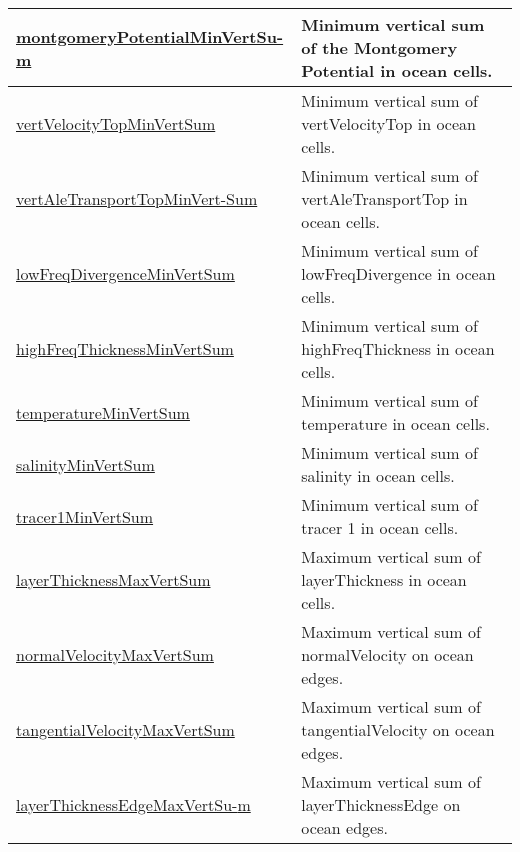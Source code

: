 {\begin{center}
\begin{longtable}{| p{2.0in} | p{4.0in} |}
	\hline
	\hyperref[subsec:var_sec_amGlobalStats_montgomeryPotentialMinVertSum]{montgomeryPotentialMinVertSu-}\hyperref[subsec:var_sec_amGlobalStats_montgomeryPotentialMinVertSum]{m}  & Minimum vertical sum of the Montgomery Potential in ocean cells. \\
	\hline
	\hyperref[subsec:var_sec_amGlobalStats_vertVelocityTopMinVertSum]{vertVelocityTopMinVertSum} & Minimum vertical sum of vertVelocityTop in ocean cells. \\
	\hline
	\hyperref[subsec:var_sec_amGlobalStats_vertAleTransportTopMinVertSum]{vertAleTransportTopMinVert-}\hyperref[subsec:var_sec_amGlobalStats_vertAleTransportTopMinVertSum]{Sum}  & Minimum vertical sum of vertAleTransportTop in ocean cells. \\
	\hline
	\hyperref[subsec:var_sec_amGlobalStats_lowFreqDivergenceMinVertSum]{lowFreqDivergenceMinVertSum} & Minimum vertical sum of lowFreqDivergence in ocean cells. \\
	\hline
	\hyperref[subsec:var_sec_amGlobalStats_highFreqThicknessMinVertSum]{highFreqThicknessMinVertSum} & Minimum vertical sum of highFreqThickness in ocean cells. \\
	\hline
	\hyperref[subsec:var_sec_amGlobalStats_temperatureMinVertSum]{temperatureMinVertSum} & Minimum vertical sum of temperature in ocean cells. \\
	\hline
	\hyperref[subsec:var_sec_amGlobalStats_salinityMinVertSum]{salinityMinVertSum} & Minimum vertical sum of salinity in ocean cells. \\
	\hline
	\hyperref[subsec:var_sec_amGlobalStats_tracer1MinVertSum]{tracer1MinVertSum} & Minimum vertical sum of tracer 1 in ocean cells. \\
	\hline
	\hyperref[subsec:var_sec_amGlobalStats_layerThicknessMaxVertSum]{layerThicknessMaxVertSum} & Maximum vertical sum of layerThickness in ocean cells. \\
	\hline
	\hyperref[subsec:var_sec_amGlobalStats_normalVelocityMaxVertSum]{normalVelocityMaxVertSum} & Maximum vertical sum of normalVelocity on ocean edges. \\
	\hline
	\hyperref[subsec:var_sec_amGlobalStats_tangentialVelocityMaxVertSum]{tangentialVelocityMaxVertSum} & Maximum vertical sum of tangentialVelocity on ocean edges. \\
	\hline
	\hyperref[subsec:var_sec_amGlobalStats_layerThicknessEdgeMaxVertSum]{layerThicknessEdgeMaxVertSu-}\hyperref[subsec:var_sec_amGlobalStats_layerThicknessEdgeMaxVertSum]{m}  & Maximum vertical sum of layerThicknessEdge on ocean edges. \\

\end{longtable}
\end{center}}
